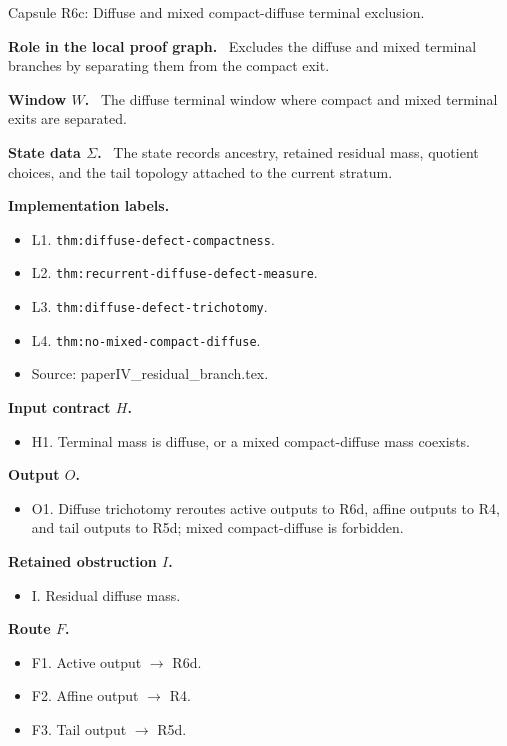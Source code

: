 \documentclass[11pt]{amsart}
\newcommand{\capsulefield}[1]{\par\smallskip\noindent\textbf{#1.}\ }
\begin{document}
\begin{proofcapsule}{Capsule R6c: Diffuse and mixed compact-diffuse terminal exclusion.}
  \capsulefield{Role in the local proof graph}
  Excludes the diffuse and mixed terminal branches by separating them from the compact exit.

  \capsulefield{Window \(W\)}
The diffuse terminal window where compact and mixed terminal exits are separated.

  \capsulefield{State data \(\Sigma\)}
The state records ancestry, retained residual mass, quotient choices, and the tail topology attached to the current stratum.

  \capsulefield{Implementation labels}
  \begin{itemize}[leftmargin=1.8em]
  \item L1. \texttt{thm:diffuse-defect-compactness}.
  \item L2. \texttt{thm:recurrent-diffuse-defect-measure}.
  \item L3. \texttt{thm:diffuse-defect-trichotomy}.
  \item L4. \texttt{thm:no-mixed-compact-diffuse}.
  \item Source: paperIV\_residual\_branch.tex.
  \end{itemize}

  \capsulefield{Input contract \(H\)}
  \begin{itemize}[leftmargin=1.8em]
  \item H1. Terminal mass is diffuse, or a mixed compact-diffuse mass coexists.
  \end{itemize}

  \capsulefield{Output \(O\)}
  \begin{itemize}[leftmargin=1.8em]
  \item O1. Diffuse trichotomy reroutes active outputs to R6d, affine outputs to R4, and tail outputs to R5d; mixed compact-diffuse is forbidden.
  \end{itemize}

  \capsulefield{Retained obstruction \(I\)}
  \begin{itemize}[leftmargin=1.8em]
  \item I. Residual diffuse mass.
  \end{itemize}

  \capsulefield{Route \(F\)}
  \begin{itemize}[leftmargin=1.8em]
  \item F1. Active output $\to$ R6d.
  \item F2. Affine output $\to$ R4.
  \item F3. Tail output $\to$ R5d.
  \end{itemize}


\end{proofcapsule}
\end{document}
